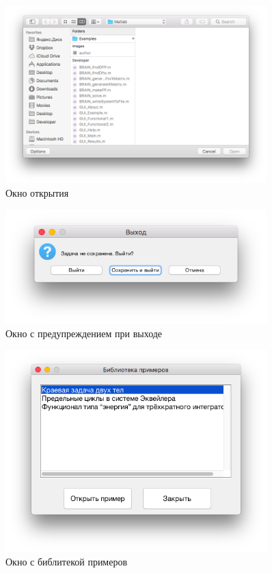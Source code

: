 \documentclass[oneside,final,12pt]{extreport}
\begin{document}
\begin{figure}[h]
	\centering
	\includegraphics[width=0.9\textwidth]{3}
	\caption{Окно открытия}
	\label{gr1}
\end{figure}

\begin{figure}[h]
	\centering
	\includegraphics[width=0.9\textwidth]{4}
	\caption{Окно с предупреждением при выходе}
	\label{gr1}
\end{figure}

\begin{figure}[h]
	\centering
	\includegraphics[width=0.9\textwidth]{5}
	\caption{Окно с библитекой примеров}
	\label{gr1}
\end{figure}
\end{document}
